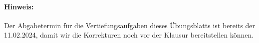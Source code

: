 \paragraph{Hinweis:} Der Abgabetermin für die Vertiefungsaufgaben dieses Übungsblatts
ist bereits der 11.02.2024,
damit wir die Korrekturen noch vor der Klausur bereitstellen können.

